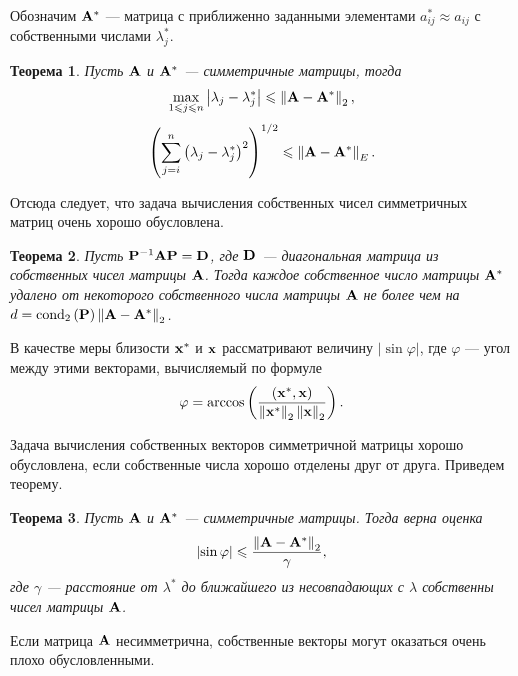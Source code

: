 \documentclass[12pt]{article}
\newtheorem{theorem}{Теорема}
\DeclareMathOperator{\cond}{cond}
\begin{document}
	Обозначим $\bold{A}^{*}$ --- матрица с приближенно заданными элементами $a^{*}_{ij}\approx a_{ij}$ с собственными числами $\lambda^{*}_{j}$.
	\begin{theorem}
		Пусть $\bold{A}$ и $\bold{A}^{*}$ --- симметричные матрицы, тогда
		\begin{equation}
			\max_{1\leqslant j \leqslant n}\left|\lambda_j-\lambda_{j}^{*}\right|\leqslant\left\|\bold{A}-\bold{A}^{*}\right\|_2,
		\end{equation}
		\begin{equation}
			\left(\sum_{j=i}^{n}\left(\lambda_j-\lambda_j^{*}\right)^2\right)^{1/2}\leqslant\left\|\bold{A}-\bold{A}^{*}\right\|_E.
		\end{equation}
	\end{theorem}
	Отсюда следует, что задача вычисления собственных чисел симметричных матриц очень хорошо обусловлена.
	
	\begin{theorem}
		Пусть $\bold{P}^{-1}\bold{AP}=\bold{D}$, где $\bold{D}$ --- диагональная матрица из собственных чисел матрицы $\bold{A}$. Тогда каждое собственное число матрицы $\bold{A}^{*}$ удалено от некоторого собственного числа матрицы $\bold{A}$ не более чем на $d=\cond_2\left(\bold{P}\right)\left\|\bold{A}-\bold{A}^{*}\right\|_2$.
	\end{theorem}
	
	В качестве меры близости $\bold{x}^{*}$ и $\bold{x}$ рассматривают величину $\left|\sin\varphi\right|$, где $\varphi$ --- угол между этими векторами, вычисляемый по формуле
	\begin{equation}
		\varphi=\arccos\left(\frac{\left(\bold{x}^{*},\bold{x}\right)}{\left\|\bold{x}^{*}\right\|_2\left\|\bold{x}\right\|_2}\right).
	\end{equation}
	
	Задача вычисления собственных векторов симметричной матрицы хорошо обусловлена, если собственные числа хорошо отделены друг от друга. Приведем теорему.
	\begin{theorem}
		Пусть $\bold{A}$ и $\bold{A}^{*}$ --- симметричные матрицы. Тогда верна оценка
		\begin{equation}
			\left|\sin\varphi\right|\leqslant\frac{\left\|\bold{A}-\bold{A}^{*}\right\|_2}{\gamma},
		\end{equation}
		где $\gamma$ --- расстояние от $\lambda^{*}$ до ближайшего из несовпадающих с $\lambda$ собственны чисел матрицы $\bold{A}$.
	\end{theorem}
	Если матрица $\bold{A}$ несимметрична, собственные векторы могут оказаться очень плохо обусловленными.
	
\end{document}
